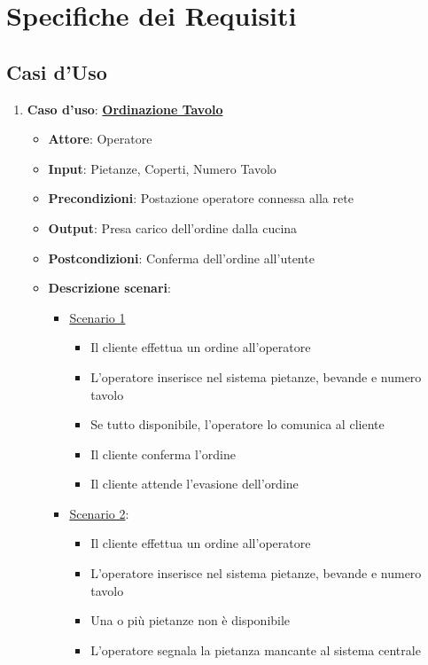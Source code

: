 \chapter{Specifiche dei Requisiti}
\section{Casi d'Uso}
\begin{enumerate}
    \item {\bf Caso d'uso}: \uline{{\bf Ordinazione Tavolo}}
    \begin{itemize}
        \item {\bf Attore}: Operatore
        \item {\bf Input}: Pietanze, Coperti, Numero Tavolo
        \item {\bf Precondizioni}: Postazione operatore connessa alla rete
        \item {\bf Output}: Presa carico dell'ordine dalla cucina
        \item {\bf Postcondizioni}: Conferma dell'ordine all'utente
        \item {\bf Descrizione scenari}:
        \begin{itemize}
            \item \uline {Scenario 1}
            \begin{itemize}
                \item Il cliente effettua un ordine all'operatore
                \item L'operatore inserisce nel sistema pietanze, bevande e 
                    numero tavolo
                \item Se tutto disponibile, l'operatore lo comunica al cliente
                \item Il cliente conferma l'ordine
                \item Il cliente attende l'evasione dell'ordine
            \end{itemize}
            \item \uline {Scenario 2}:
            \begin{itemize}
                \item Il cliente effettua un ordine all'operatore
                \item L'operatore inserisce nel sistema pietanze, bevande e numero tavolo
                \item Una o pi\`u pietanze non \`e disponibile
                \item L'operatore segnala la pietanza mancante al sistema centrale

\end{itemize}
\end{itemize}
\end{itemize}
\end{enumerate}
